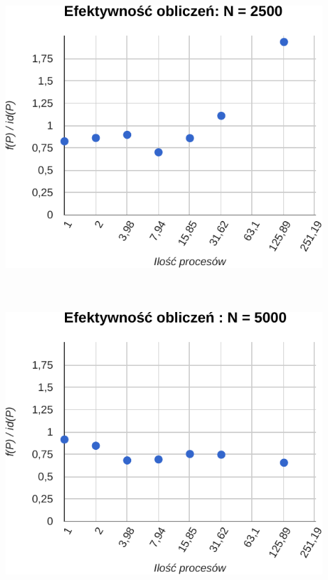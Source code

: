 \documentclass[paper=a4, fontsize=11pt]{scrartcl}	%
\numberwithin{equation}{section}		%
\numberwithin{figure}{section}			%
\numberwithin{table}{section}				%
\begin{document}
\includegraphics[width=120mm]{report/comp-eff-2500.pdf} \\ \ \\ \ \\ \ \\

\includegraphics[width=120mm]{report/comp-eff-5000.pdf} \\ \ \\ \ \\ \ \\
\end{document}
